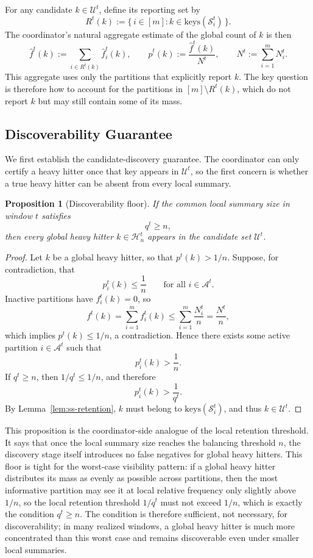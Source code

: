 \documentclass[sigconf, nonacm]{acmart}
\newtheorem{proposition}{Proposition}
\begin{document}
For any candidate \(k \in \mathcal U^t\), define its reporting set by
\[
R^t(k)
:=
\{\, i \in [m] : k \in \mathrm{keys}(\mathcal S_i^t) \,\}.
\]
The coordinator's natural aggregate estimate of the global count of \(k\) is then
\[
\hat f^t(k)
:=
\sum_{i \in R^t(k)} \hat f_i^t(k),
\qquad
\hat p^t(k)
:=
\frac{\hat f^t(k)}{N^t},
\qquad
N^t := \sum_{i=1}^m N_i^t.
\]
This aggregate uses only the partitions that explicitly report \(k\). The key question is therefore how to account for the partitions in \([m]\setminus R^t(k)\), which do not report \(k\) but may still contain some of its mass.

\subsection{Discoverability Guarantee}
\label{subsec:discoverability}

We first establish the candidate-discovery guarantee. The coordinator can only certify a heavy hitter once that key appears in \(\mathcal U^t\), so the first concern is whether a true heavy hitter can be absent from every local summary.

\begin{proposition}[Discoverability floor]
\label{prop:discoverability}
If the common local summary size in window \(t\) satisfies
\[
q^t \ge n,
\]
then every global heavy hitter \(k \in \mathcal H_n^t\) appears in the candidate set \(\mathcal U^t\).
\end{proposition}

\begin{proof}
Let \(k\) be a global heavy hitter, so that \(p^t(k) > 1/n\). Suppose, for contradiction, that
\[
p_i^t(k) \le \frac{1}{n}
\qquad
\text{for all } i \in \mathcal A^t.
\]
Inactive partitions have \(f_i^t(k)=0\), so
\[
f^t(k)
=
\sum_{i=1}^m f_i^t(k)
\le
\sum_{i=1}^m \frac{N_i^t}{n}
=
\frac{N^t}{n},
\]
which implies \(p^t(k) \le 1/n\), a contradiction. Hence there exists some active partition \(i\in\mathcal A^t\) such that
\[
p_i^t(k) > \frac{1}{n}.
\]
If \(q^t \ge n\), then \(1/q^t \le 1/n\), and therefore
\[
p_i^t(k) > \frac{1}{q^t}.
\]
By Lemma~\ref{lem:ss-retention}, \(k\) must belong to \(\mathrm{keys}(\mathcal S_i^t)\), and thus \(k \in \mathcal U^t\).
\end{proof}

This proposition is the coordinator-side analogue of the local retention threshold. It says that once the local summary size reaches the balancing threshold \(n\), the discovery stage itself introduces no false negatives for global heavy hitters. This floor is tight for the worst-case visibility pattern: if a global heavy hitter distributes its mass as evenly as possible across partitions, then the most informative partition may see it at local relative frequency only slightly above \(1/n\), so the local retention threshold \(1/q^t\) must not exceed \(1/n\), which is exactly the condition \(q^t \ge n\). The condition is therefore sufficient, not necessary, for discoverability; in many realized windows, a global heavy hitter is much more concentrated than this worst case and remains discoverable even under smaller local summaries.
\end{document}
